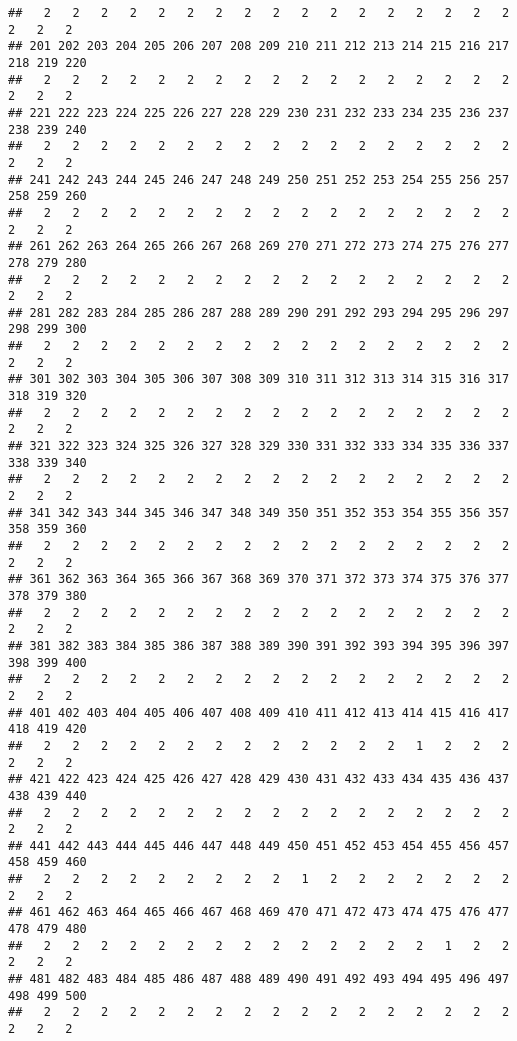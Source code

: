 \documentclass[
]{article}
\begin{document}
\begin{verbatim}
##   2   2   2   2   2   2   2   2   2   2   2   2   2   2   2   2   2   2   2   2 
## 201 202 203 204 205 206 207 208 209 210 211 212 213 214 215 216 217 218 219 220 
##   2   2   2   2   2   2   2   2   2   2   2   2   2   2   2   2   2   2   2   2 
## 221 222 223 224 225 226 227 228 229 230 231 232 233 234 235 236 237 238 239 240 
##   2   2   2   2   2   2   2   2   2   2   2   2   2   2   2   2   2   2   2   2 
## 241 242 243 244 245 246 247 248 249 250 251 252 253 254 255 256 257 258 259 260 
##   2   2   2   2   2   2   2   2   2   2   2   2   2   2   2   2   2   2   2   2 
## 261 262 263 264 265 266 267 268 269 270 271 272 273 274 275 276 277 278 279 280 
##   2   2   2   2   2   2   2   2   2   2   2   2   2   2   2   2   2   2   2   2 
## 281 282 283 284 285 286 287 288 289 290 291 292 293 294 295 296 297 298 299 300 
##   2   2   2   2   2   2   2   2   2   2   2   2   2   2   2   2   2   2   2   2 
## 301 302 303 304 305 306 307 308 309 310 311 312 313 314 315 316 317 318 319 320 
##   2   2   2   2   2   2   2   2   2   2   2   2   2   2   2   2   2   2   2   2 
## 321 322 323 324 325 326 327 328 329 330 331 332 333 334 335 336 337 338 339 340 
##   2   2   2   2   2   2   2   2   2   2   2   2   2   2   2   2   2   2   2   2 
## 341 342 343 344 345 346 347 348 349 350 351 352 353 354 355 356 357 358 359 360 
##   2   2   2   2   2   2   2   2   2   2   2   2   2   2   2   2   2   2   2   2 
## 361 362 363 364 365 366 367 368 369 370 371 372 373 374 375 376 377 378 379 380 
##   2   2   2   2   2   2   2   2   2   2   2   2   2   2   2   2   2   2   2   2 
## 381 382 383 384 385 386 387 388 389 390 391 392 393 394 395 396 397 398 399 400 
##   2   2   2   2   2   2   2   2   2   2   2   2   2   2   2   2   2   2   2   2 
## 401 402 403 404 405 406 407 408 409 410 411 412 413 414 415 416 417 418 419 420 
##   2   2   2   2   2   2   2   2   2   2   2   2   2   1   2   2   2   2   2   2 
## 421 422 423 424 425 426 427 428 429 430 431 432 433 434 435 436 437 438 439 440 
##   2   2   2   2   2   2   2   2   2   2   2   2   2   2   2   2   2   2   2   2 
## 441 442 443 444 445 446 447 448 449 450 451 452 453 454 455 456 457 458 459 460 
##   2   2   2   2   2   2   2   2   2   1   2   2   2   2   2   2   2   2   2   2 
## 461 462 463 464 465 466 467 468 469 470 471 472 473 474 475 476 477 478 479 480 
##   2   2   2   2   2   2   2   2   2   2   2   2   2   2   1   2   2   2   2   2 
## 481 482 483 484 485 486 487 488 489 490 491 492 493 494 495 496 497 498 499 500 
##   2   2   2   2   2   2   2   2   2   2   2   2   2   2   2   2   2   2   2   2 

\end{verbatim}
\end{document}
